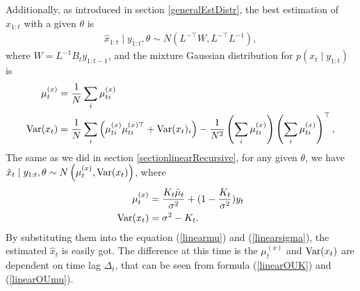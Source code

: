 Additionally, as introduced in section \ref{generalEstDistr}, the best estimation of $x_{1:t}$ with a given $\theta$ is 
\begin{align*}
\hat{x}_{1:t} \mid y_{1:t},\theta \sim N(L^{-\top}W,L^{-\top}L^{-1}),
\end{align*}
where $W = L^{-1}B_{t}y_{1:t-1}$, and the mixture Gaussian distribution for $p(x_t \mid y_{1:t})$ is 
\begin{align}
\mu_t^{(x)} &= \frac{1}{N} \sum_i \mu_{ti}^{(x)}  \\
\mathrm{Var}(x_t) &= \frac{1}{N} \sum_i \left( \mu_{ti}^{(x)}  \mu_{ti}^{(x)\top} +\mathrm{Var}(x_t)_i\right) -\frac{1}{N^2} \left(  \sum_i  \mu_{ti}^{(x)} \right) \left( \sum_i \mu_{ti}^{(x)} \right) ^\top,
\end{align}
The same as we did in section \ref{sectionlinearRecursive}, for any given $\theta$, we have $\hat{x}_{t}\mid y_{1:t},\theta \sim N\left( \mu_{t}^{(x)},\mathrm{Var}(x_t) \right)$, where
\begin{align*}
\mu_{t}^{(x)} &  =  \frac{K_{t}\bar{\mu}_{t}}{\sigma^2}+(1-\frac{K_{t}}{\sigma^2})y_{t} \\
\mathrm{Var}(x_t)&= \sigma^2-K_{t}.
\end{align*}
By substituting them into the equation (\ref{linearmu}) and (\ref{linearsigma}), the estimated $\hat{x}_t$ is easily got. The difference at this time is the $\mu_{t}^{(x)}$ and $\mathrm{Var}(x_t)$ are dependent on time lag $\Delta_t$, that can be seen from formula (\ref{linearOUK}) and (\ref{linearOUmu}). 



